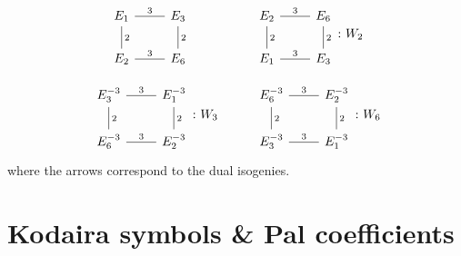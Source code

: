 \documentclass[11pt]{article}
\theoremstyle{definition}
\begin{document}
\[ 
\begin{tikzcd}
E_1 \arrow[dash]{r}{3} 
    \arrow[dash]{d}{2} & 
    E_3  \arrow[dash]{d}{2} \\
 E_2 \arrow[dash]{r}{3} & E_6   
\end{tikzcd}
\phantom{\colon W_2}
\hskip 1truecm
\begin{tikzcd}
E_2 \arrow[dash]{r}{3} 
    \arrow[dash]{d}{2} & 
    E_6  \arrow[dash]{d}{2} \\
 E_1 \arrow[dash]{r}{3} & E_3   
\end{tikzcd}
\colon W_2
\]

\[ 
\begin{tikzcd}
E_3^{-3} \arrow[dash]{r}{3} 
    \arrow[dash]{d}{2} & 
    E_1^{-3}  \arrow[dash]{d}{2} \\
 E_6^{-3} \arrow[dash]{r}{3} & E_2^{-3}   
\end{tikzcd} \colon W_3
\hskip 1truecm
\begin{tikzcd}
E_6^{-3} \arrow[dash]{r}{3} 
    \arrow[dash]{d}{2} & 
    E_2^{-3}  \arrow[dash]{d}{2} \\
 E_3^{-3} \arrow[dash]{r}{3} & E_1^{-3} 
\end{tikzcd}
\colon W_6
\]
where the  
arrows correspond to the dual isogenies.


\section{Kodaira symbols \& Pal coefficients}
\end{document}

